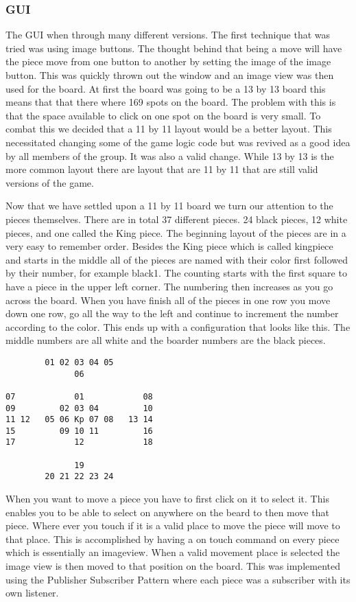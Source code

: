 \documentclass{article}
\begin{document}
\subsubsection{GUI}
	The GUI when through many different versions. The first technique that was tried was using image buttons. The thought behind that being a move will have the piece move from one button to another by setting the image of the image button. This was quickly thrown out the window and an image view was then used for the board. At first the board was going to be a 13 by 13 board this means that that there where 169 spots on the board. The problem with this is that the space available to click on one spot on the board is very small. To combat this we decided that a 11 by 11 layout would be a better layout. This necessitated changing some of the game logic code but was revived as a good idea by all members of the group. It was also a valid change. While 13 by 13 is the more common layout there are layout that are 11 by 11 that are still valid versions of the game. \par
	Now that we have settled upon a 11 by 11 board we turn our attention to the pieces themselves. There are in total 37 different pieces. 24 black pieces, 12 white pieces, and one called the King piece.  The beginning layout of the pieces are in a very easy to remember order. Besides the King piece which is called kingpiece and starts in the middle all of the pieces are named with their color first followed by their number, for example black1. The counting starts with the first square to have a piece in the upper left corner. The numbering then increases as you go across the board. When you have finish all of the pieces in one row you move down one row, go all the way to the left and continue to increment the number according to the color. This ends up with a configuration that looks like this. The middle numbers are all white and the boarder numbers are the black pieces.
\begin{verbatim}
        01 02 03 04 05
              06
      
07            01            08
09         02 03 04         10
11 12   05 06 Kp 07 08   13 14
15         09 10 11         16
17            12            18

              19
        20 21 22 23 24
\end{verbatim}
When you want to move a piece you have to first click on it to select it. This enables you to be able to select on anywhere on the beard to then move that piece. Where ever you touch if it is a valid place to move the piece will move to that place. This is accomplished by having a on touch command on every piece which is essentially an imageview. When a valid movement place is selected the image view is then moved to that position on the board. This was implemented using the Publisher Subscriber Pattern where each piece was a subscriber with its own listener. 
\end{document}

